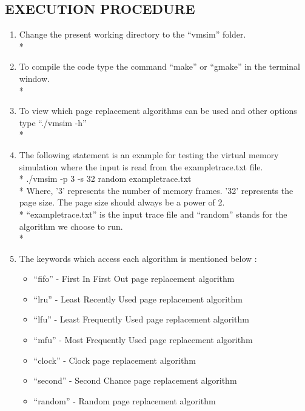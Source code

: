 \documentclass[12pt, oneside, a4paper]{report}
\begin{document}
\subsection*{EXECUTION PROCEDURE}
\begin{enumerate}
\item Change the present working directory to the “vmsim” folder.
\\*
\item To compile the code type the command “make” or “gmake” in the terminal window.
\\*
\item To view which page replacement algorithms can be used and other options type “./vmsim -h”
\\*
\item The following statement is an example for testing the virtual memory simulation where the input is read from the exampletrace.txt file.
\\*
./vmsim -p 3 -s 32 random exampletrace.txt
\\*
Where, '3' represents the number of memory frames. '32' represents the page size. The page size should always be a power of 2.
\\*
“exampletrace.txt” is the input trace file and “random” stands for the algorithm we choose to run.
\\*
\newpage
\item The keywords which access each algorithm is mentioned below :
\begin{itemize}
\item “fifo” - First In First Out  page replacement algorithm
\item “lru” -  Least Recently Used page replacement algorithm
\item “lfu” -  Least Frequently Used page replacement algorithm
\item “mfu” - Most Frequently Used page replacement algorithm
\item “clock” - Clock page replacement algorithm
\item “second” - Second Chance page replacement algorithm
\item “random” - Random page replacement algorithm
\end{itemize}      
\end{enumerate}
\newpage
\end{document}
